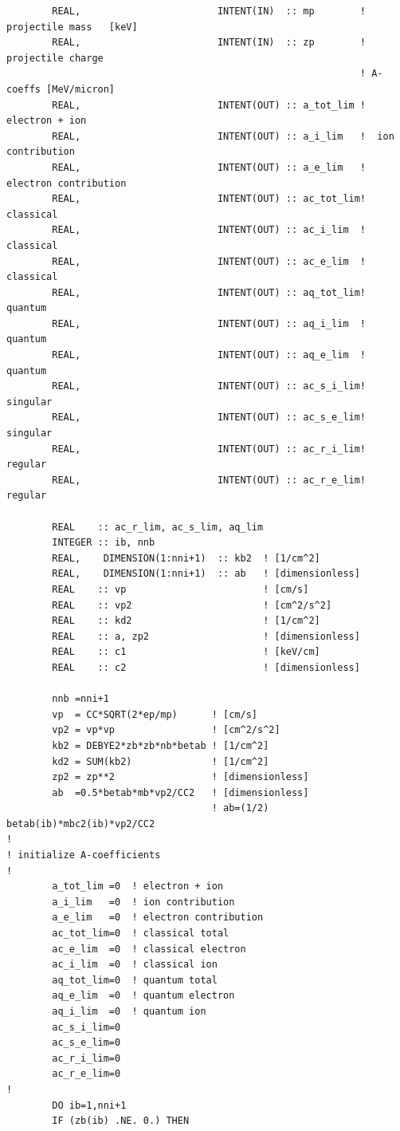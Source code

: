 \documentclass[preprint,12pt,eqsecnum,nofootinbib,amsmath,amssymb]{revtex4}
\begin{document}
{\begin{verbatim}
        REAL,                        INTENT(IN)  :: mp        !  projectile mass   [keV]
        REAL,                        INTENT(IN)  :: zp        !  projectile charge
                                                              ! A-coeffs [MeV/micron]
        REAL,                        INTENT(OUT) :: a_tot_lim !  electron + ion
        REAL,                        INTENT(OUT) :: a_i_lim   !  ion contribution
        REAL,                        INTENT(OUT) :: a_e_lim   !  electron contribution
        REAL,                        INTENT(OUT) :: ac_tot_lim!  classical
        REAL,                        INTENT(OUT) :: ac_i_lim  !  classical
        REAL,                        INTENT(OUT) :: ac_e_lim  !  classical
        REAL,                        INTENT(OUT) :: aq_tot_lim!  quantum
        REAL,                        INTENT(OUT) :: aq_i_lim  !  quantum
        REAL,                        INTENT(OUT) :: aq_e_lim  !  quantum
        REAL,                        INTENT(OUT) :: ac_s_i_lim!  singular
        REAL,                        INTENT(OUT) :: ac_s_e_lim!  singular
        REAL,                        INTENT(OUT) :: ac_r_i_lim!  regular
        REAL,                        INTENT(OUT) :: ac_r_e_lim!  regular

        REAL    :: ac_r_lim, ac_s_lim, aq_lim
        INTEGER :: ib, nnb
        REAL,    DIMENSION(1:nni+1)  :: kb2  ! [1/cm^2]
        REAL,    DIMENSION(1:nni+1)  :: ab   ! [dimensionless]
        REAL    :: vp                        ! [cm/s]
        REAL    :: vp2                       ! [cm^2/s^2]
        REAL    :: kd2                       ! [1/cm^2]
        REAL    :: a, zp2                    ! [dimensionless]
        REAL    :: c1                        ! [keV/cm]
        REAL    :: c2                        ! [dimensionless]

        nnb =nni+1
        vp  = CC*SQRT(2*ep/mp)      ! [cm/s]
        vp2 = vp*vp                 ! [cm^2/s^2]
        kb2 = DEBYE2*zb*zb*nb*betab ! [1/cm^2]
        kd2 = SUM(kb2)              ! [1/cm^2]
        zp2 = zp**2                 ! [dimensionless]
        ab  =0.5*betab*mb*vp2/CC2   ! [dimensionless]
                                    ! ab=(1/2) betab(ib)*mbc2(ib)*vp2/CC2 
!
! initialize A-coefficients
!
        a_tot_lim =0  ! electron + ion
        a_i_lim   =0  ! ion contribution
        a_e_lim   =0  ! electron contribution
        ac_tot_lim=0  ! classical total
        ac_e_lim  =0  ! classical electron
        ac_i_lim  =0  ! classical ion
        aq_tot_lim=0  ! quantum total
        aq_e_lim  =0  ! quantum electron
        aq_i_lim  =0  ! quantum ion
        ac_s_i_lim=0 
        ac_s_e_lim=0 
        ac_r_i_lim=0
        ac_r_e_lim=0
!
        DO ib=1,nni+1
        IF (zb(ib) .NE. 0.) THEN


\end{verbatim}}
\end{document}
